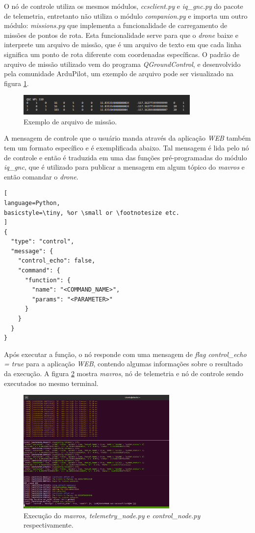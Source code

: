 \documentclass[12pt,a4paper,oneside]{book}
\begin{document}
O nó de controle utiliza os mesmos módulos, \textit{ccsclient.py} e \textit{iq\_gnc.py} do pacote de telemetria, entretanto não utiliza o módulo \textit{companion.py} e importa um outro módulo: \textit{missions.py} que implementa a funcionalidade de carregamento de missões de pontos de rota. Esta funcionalidade serve para que o \textit{drone} baixe e interprete um arquivo de missão, que é um arquivo de texto em que cada linha significa um ponto de rota diferente com coordenadas específicas. O padrão de arquivo de missão utilizado vem do programa \textit{QGroundControl}, e desenvolvido pela comunidade ArduPilot, um exemplo de arquivo pode ser visualizado na figura \ref{fig:qgcwpl.png.0}.
%
\begin{figure}[!htbp]
  \centering
  \includegraphics[width=0.8\textwidth]{Images/Desenvolvimento/qgcwpl.png}
  \caption{Exemplo de arquivo de missão.}
  \label{fig:qgcwpl.png.0}
\end{figure}
%

A mensagem de controle que o usuário manda através da aplicação \textit{WEB} também tem um formato específico e é exemplificada abaixo. Tal mensagem é lida pelo nó de controle e então é traduzida em uma das funções pré-programadas do módulo \textit{iq\_gnc}, que é utilizado para publicar a mensagem em algum tópico do \textit{mavros} e então comandar o \textit{drone}. 

\begin{lstlisting}[
language=Python,
basicstyle=\tiny, %or \small or \footnotesize etc.
]
{
  "type": "control",
  "message": {
    "control_echo": false,
    "command": {
      "function": {
        "name": "<COMMAND_NAME>",
        "params": "<PARAMETER>"
      }
    }
  }
}
\end{lstlisting}
Após executar a função, o nó responde com uma mensagem de \textit{flag control\_echo = true} para a aplicação \textit{WEB}, contendo algumas informações sobre o resultado da execução. A figura \ref{fig:control_node.png.0} mostra \textit{mavros}, nó de telemetria e nó de controle sendo executados no mesmo terminal. 
%
\begin{figure}[!htbp]
  \centering
  \includegraphics[width=0.7\textwidth]{Images/Desenvolvimento/control_node.png}
  \caption{Execução do \textit{mavros, telemetry\_node.py} e \textit{control\_node.py} respectivamente.}
  \label{fig:control_node.png.0}
\end{figure}
%
\end{document}
